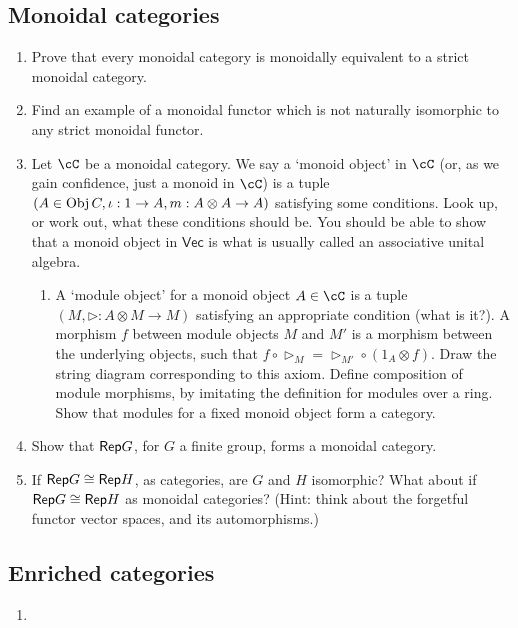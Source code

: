 \documentclass[12pt]{amsart}
\begin{document}
\subsection{Monoidal categories}
\begin{enumerate}
\item Prove that every monoidal category is monoidally equivalent to a strict monoidal category.
\item Find an example of a monoidal functor which is not naturally isomorphic to any strict monoidal functor.
\item Let $\cC$ be a monoidal category. We say a `monoid object' in $\cC$ (or, as we gain confidence, just a monoid in $\cC$) is a tuple $(A \in \operatorname{Obj} C, \iota: 1 \to A, m: A \otimes A \to A)$ satisfying some conditions. Look up, or work out, what these conditions should be. You should be able to show that a monoid object in $\mathsf{Vec}$ is what is usually called an associative unital algebra.
\begin{enumerate}
\item A `module object' for a monoid object $A \in \cC$ is a tuple $(M, \triangleright: A \otimes M \to M)$ satisfying an appropriate condition (what is it?). A morphism $f$ between module objects $M$ and $M'$ is a morphism between the underlying objects, such that $f \circ \triangleright_M = \triangleright_{M'} \circ (1_A \otimes f)$. Draw the string diagram corresponding to this axiom. Define composition of module morphisms, by imitating the definition for modules over a ring. Show that modules for a fixed monoid object form a category.
\end{enumerate}
\item Show that $\mathsf{Rep} G$, for $G$ a finite group, forms a monoidal category.
\item If $\mathsf{Rep} G \cong \mathsf{Rep} H$, as categories, are $G$ and $H$ isomorphic? What about if $\mathsf{Rep} G \cong \mathsf{Rep} H$ as monoidal categories? (Hint: think about the forgetful functor vector spaces, and its automorphisms.)
\end{enumerate}

\subsection{Enriched categories}
\begin{enumerate}
\item
\end{enumerate}
\end{document}
